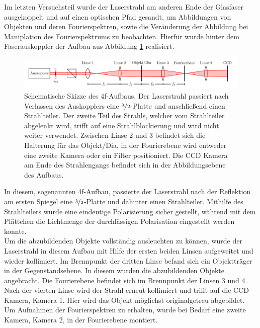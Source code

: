 

Im letzten Versuchsteil wurde der Laserstrahl am anderen Ende der Glasfaser ausgekoppelt und auf einen optischen Pfad gesandt, um Abbildungen von Objekten und deren Fourierspektren, sowie die Veränderung der Abbildung bei Maniplation des Fourierspektrums zu beobachten. Hierfür wurde hinter dem Faserauskoppler der Aufbau aus Abbildung \ref{fig:4f-aufbau} realisiert.

\begin{figure}[h]
	\centering
	\includegraphics[width=1\linewidth]{graphs/versuchsaufbau/4f-aufbau.pdf}
	\caption[Schematische Skizze des 4f-Aufbaus]{
		Schematische Skizze des 4f-Aufbaus. Der Laserstrahl passiert nach Verlassen des Auskopplers eine $\nicefrac{\lambda}{2}$-Platte und anschließend einen Strahlteiler. Der zweite Teil des Strahls, welcher vom Strahlteiler abgelenkt wird, trifft auf eine Strahlblockierung und wird nicht weiter verwendet. Zwischen Linse 2 und 3 befindet sich die Halterung für das Objekt/Dia, in der Fourierebene wird entweder eine zweite Kamera oder ein Filter positioniert. Die CCD Kamera am Ende des Strahlengangs befindet sich in der Abbildungsebene des Aufbaus.
	}
	\label{fig:4f-aufbau}
\end{figure}

In diesem, sogenannten 4f-Aufbau, passierte der Laserstrahl nach der Reflektion am ersten Spiegel eine $\nicefrac{\lambda}{2}$-Platte und dahinter einen Strahlteiler. Mithilfe des Strahlteilers wurde eine eindeutige Polarisierung sicher gestellt, während mit dem Plättchen die Lichtmenge der durchlässigen Polarisation eingestellt werden konnte.\\

Um die abzubildenden Objekte vollständig ausleuchten zu können, wurde der Laserstrahl in diesem Aufbau mit Hilfe der ersten beiden Linsen aufgeweitet und wieder kollimiert. Im Brennpunkt der dritten Linse befand sich ein Objektträger in der Gegenstandsebene. In diesem wurden die abzubildenden Objekte angebracht. Die Fourierebene befindet sich im Brennpunkt der Linsen 3 und 4. Nach der vierten Linse wird der Strahl erneut kollimiert und trifft auf die CCD Kamera, Kamera 1. Hier wird das Objekt möglichst originalgetreu abgebildet. Um Aufnahmen der Fourierspektren zu erhalten, wurde bei Bedarf eine zweite Kamera, Kamera 2, in der Fourierebene montiert. \\ 

